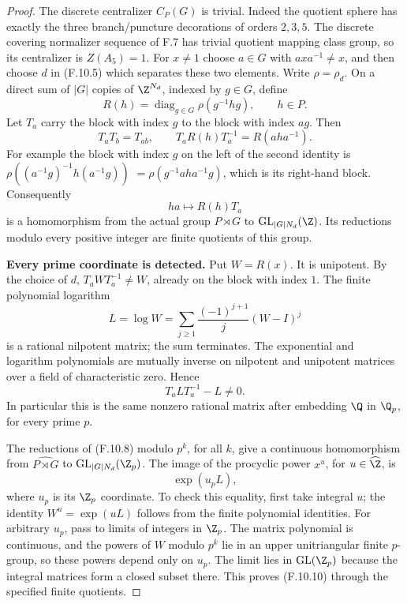 \begin{proof}
The discrete centralizer $C_P(G)$ is trivial.
Indeed the quotient sphere has exactly the three
branch/puncture decorations of orders $2,3,5$.
The discrete covering normalizer sequence of F.7
has trivial quotient mapping class group, so its
centralizer is $Z(A_5)=1$.
For $x\ne1$ choose $a\in G$ with
$axa^{-1}\ne x$, and then choose $d$ in (F.10.5)
which separates these two elements.  Write $\rho=\rho_d$.
On a direct sum of $|G|$ copies of $\Z^{N_d}$,
indexed by $g\in G$, define
\[
       R(h)=\operatorname{diag}_{g\in G}
                              \rho(g^{-1}hg),\qquad h\in P.
                                                               \tag{F.10.6}
\]
Let $T_a$ carry the block with index $g$ to the block
with index $ag$.  Then
\[
 T_aT_b=T_{ab},\qquad
 T_aR(h)T_a^{-1}=R(aha^{-1}).                            \tag{F.10.7}
\]
For example the block with index $g$ on the left of
the second identity is
$\rho((a^{-1}g)^{-1}h(a^{-1}g))$
$=\rho(g^{-1}aha^{-1}g)$, which is its right-hand
block.  Consequently
\[
       h a\longmapsto R(h)T_a                          \tag{F.10.8}
\]
is a homomorphism from the actual group $P\rtimes G$
to $\operatorname{GL}_{|G|N_d}(\Z)$.
Its reductions modulo every positive integer are
finite quotients of this group.

\textbf{Every prime coordinate is detected.}
Put $W=R(x)$.  It is unipotent.  By the choice of
$d$, $T_aWT_a^{-1}\ne W$, already on the block
with index $1$.  The finite polynomial logarithm
\[
        L=\log W=\sum_{j\geq1}
                      \frac{(-1)^{j+1}}j(W-I)^j
\]
is a rational nilpotent matrix; the sum terminates.
The exponential and logarithm polynomials are
mutually inverse on nilpotent and unipotent matrices
over a field of characteristic zero.  Hence
\[
                       T_aLT_a^{-1}-L\ne0.             \tag{F.10.9}
\]
In particular this is the same nonzero rational
matrix after embedding $\Q$ in $\Q_p$, for every
prime $p$.

The reductions of (F.10.8) modulo $p^k$, for all
$k$, give a continuous homomorphism from
$\widehat{P\rtimes G}$ to
$\operatorname{GL}_{|G|N_d}(\Z_p)$.
The image of the procyclic power $x^u$, for
$u\in\widehat\Z$, is
\[
                          \exp(u_p L),                 \tag{F.10.10}
\]
where $u_p$ is its $\Z_p$ coordinate.
To check this equality, first take integral $u$;
the identity $W^u=\exp(uL)$ follows from the finite
polynomial identities.  For arbitrary $u_p$, pass
to limits of integers in $\Z_p$.  The matrix
polynomial is continuous, and the powers of $W$
modulo $p^k$ lie in an upper unitriangular finite
$p$-group, so these powers depend only on $u_p$.
The limit lies in $\operatorname{GL}(\Z_p)$ because
the integral matrices form a closed subset there.
This proves (F.10.10) through the specified finite
quotients.


\end{proof}
